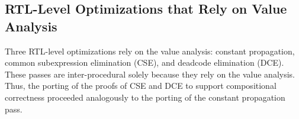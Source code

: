 





\subsection{RTL-Level Optimizations that Rely on Value Analysis}

Three RTL-level optimizations rely on the value analysis: constant propagation, common subexpression
elimination (CSE), and deadcode elimination (DCE).  These passes are inter-procedural solely because
they rely on the value analysis.  Thus, the porting of the proofs of CSE and DCE to support
compositional correctness proceeded analogously to the porting of the constant propagation pass.


